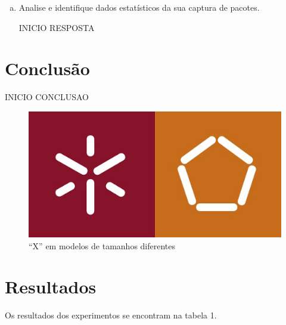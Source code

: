 \documentclass{llncs}
\begin{document}
\begin{enumerate}[d)]
  \item Analise e identifique dados estatísticos da sua captura de pacotes.

  \begin{flushleft}
    INICIO RESPOSTA
  \end{flushleft}
\end{enumerate}


\section{Conclusão}
  \begin{flushleft}
    INICIO CONCLUSAO

  \end{flushleft}

\newpage



\begin{figure}[ht]
\includegraphics[scale=0.5]{uminho.jpg}
\centering
\caption{\enquote{X} em modelos de tamanhos diferentes}
\label{fig:xs}
\end{figure}

%
\section{Resultados}
%
Os resultados dos experimentos se encontram na tabela 1. 
\end{document}
